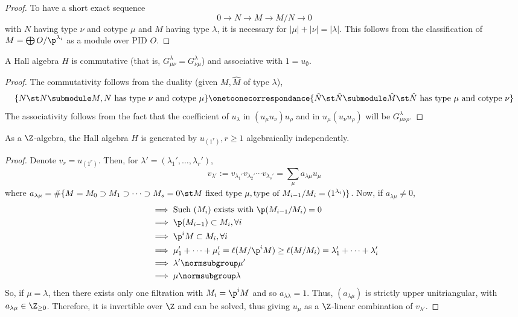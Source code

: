 \documentclass[11pt,leqno,oneside]{amsbook}
\numberwithin{thm}{section}
\newcommand{\subtableau}{\normsubgroup}
\begin{document}
\begin{proof}
  To have a short exact sequence \[
    0 \to N \to M \to M/N \to 0
  \]
  with \(N\) having type \(\nu\) and cotype \(\mu\) and \(M\) having
  type \(\lambda\), it is necessary for \(|\mu| + |\nu| =
  |\lambda|\). This follows from the classification of \(M = \bigoplus
  O/\p^{\lambda_i}\) as a module over PID \(O\).
\end{proof}
\begin{prop}
  A Hall algebra \(H\) is commutative (that is, \(G^\lambda_{\mu \nu}
  = G^\lambda_{\nu \mu}\)) and associative with \(1 =
  u_\emptyset\). 
\end{prop}
\begin{proof}
  The commutativity follows from the duality (given \(M,\hat{M}\) of
  type \(\lambda\)),  \[
    \{N \st N \submodule M, N \text{ has type }\nu \text{ and cotype
    }\mu \} \onetoonecorrespondance \{\hat{N}  \st \hat{N} \submodule \hat{M} \st \hat{N}
    \text{ has type }\mu \text{ and cotype }\nu\}
  \]
  The associativity follows from the fact that the coefficient of
  \(u_\lambda\) in \((u_\mu u_\nu) u_\rho\) and in \(u_\mu(u_\nu
  u_\rho)\) will be \(G^\lambda_{\mu \nu \rho}\).
\end{proof}
\begin{prop}
  As a \(\Z\)-algebra, the Hall algebra \(H\) is generated by
  \(u_{(1^r)}, r \geq 1\) algebraically independently.
\end{prop}
\begin{proof}
  Denote \(v_r = u_{(1^r)}\). Then, for \(\lambda' = (\lambda_1',
  \ldots, \lambda_r')\), \[
    v_{\lambda'} := v_{\lambda_1'} v_{\lambda_2'} \cdots v_{\lambda_s'}
    = \sum_\mu a_{\lambda \mu} u_\mu
  \]
  where \(a_{\lambda \mu} = \#\{M=M_0 \supset M_1 \supset \cdots
  \supset M_s = 0 \st M \text{ fixed type }\mu, \text{type of
  }M_{i-1}/M_i = (1^{\lambda_i})\}\). Now, if \(a_{\lambda \mu} \neq
  0\),
  \begin{align*}
    & \implies \text{Such } (M_i) \text{ exists with }\p(M_{i-1}/M_i)
      = 0 \\
    & \implies \p(M_{i-1}) \subset M_i, \forall i \\
    & \implies \p^i M \subset M_i,
      \forall i \\
    & \implies \mu_1' + \cdots + \mu_i' = \ell(M/\p^iM) \geq
      \ell(M/M_i) = \lambda_1' + \cdots + \lambda_i' \\
    & \implies \lambda' \subtableau \mu' \\
    & \implies \mu \subtableau \lambda
  \end{align*}
  So, if \(\mu = \lambda\), then there exists only one filtration with
  \(M_i = \p^i M\) and so \(a_{\lambda \lambda} = 1\). Thus,
  \((a_{\lambda \mu})\) is strictly upper unitriangular, with \(a_{\lambda
    \mu} \in \Z_{\geq 0}\). Therefore, it is invertible over \(\Z\)
  and can be solved, thus giving \(u_\mu\) as a \(\Z\)-linear
  combination of \(v_{\lambda'}\). 
\end{proof}
\end{document}
